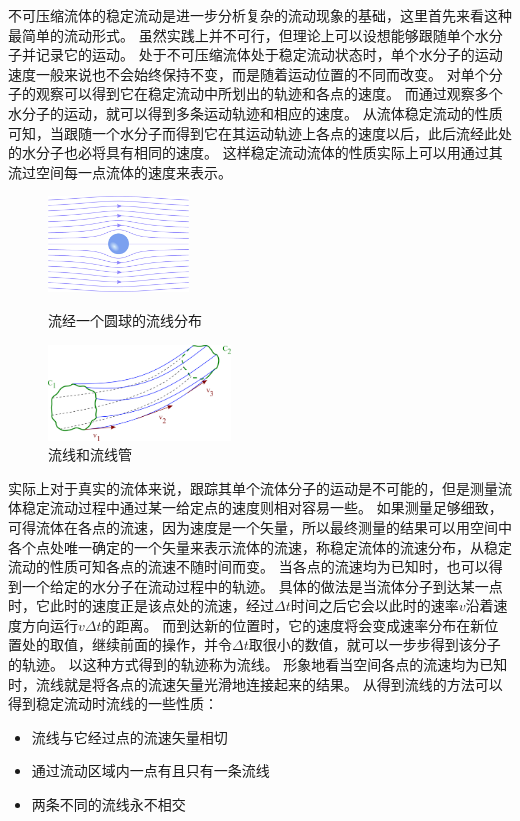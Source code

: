 不可压缩流体的稳定流动是进一步分析复杂的流动现象的基础，这里首先来看这种最简单的流动形式。
虽然实践上并不可行，但理论上可以设想能够跟随单个水分子并记录它的运动。
处于不可压缩流体处于稳定流动状态时，单个水分子的运动速度一般来说也不会始终保持不变，而是随着运动位置的不同而改变。
对单个分子的观察可以得到它在稳定流动中所划出的轨迹和各点的速度。
而通过观察多个水分子的运动，就可以得到多条运动轨迹和相应的速度。
从流体稳定流动的性质可知，当跟随一个水分子而得到它在其运动轨迹上各点的速度以后，此后流经此处的水分子也必将具有相同的速度。
这样稳定流动流体的性质实际上可以用通过其流过空间每一点流体的速度来表示。


\begin{figure}[hbtp]
\begin{minipage}[c]{0.45\textwidth}
\begin{center}
\includegraphics[height=1in]{images/Bubble_Buoyancy.pdf}
\end{center}
\caption{流经一个圆球的流线分布}
\label{fig: motion-流经一个圆球的流线分布}
\end{minipage}
\begin{minipage}[c]{0.45\textwidth}
\begin{center}
\includegraphics[height=1in]{images/motion-Streamlines_and_streamtube.pdf}
\end{center}
\caption{流线和流线管}
\label{fig: motion-流线和流线管}
\end{minipage}
\end{figure}


实际上对于真实的流体来说，跟踪其单个流体分子的运动是不可能的，但是测量流体稳定流动过程中通过某一给定点的速度则相对容易一些。
如果测量足够细致，可得流体在各点的流速，因为速度是一个矢量，所以最终测量的结果可以用空间中各个点处唯一确定的一个矢量来表示流体的流速，称稳定流体的流速分布，从稳定流动的性质可知各点的流速不随时间而变。
当各点的流速均为已知时，也可以得到一个给定的水分子在流动过程中的轨迹。
具体的做法是当流体分子到达某一点时，它此时的速度正是该点处的流速，经过$\Delta t$时间之后它会以此时的速率$v$沿着速度方向运行$v\Delta t$的距离。
而到达新的位置时，它的速度将会变成速率分布在新位置处的取值，继续前面的操作，并令$\Delta t$取很小的数值，就可以一步步得到该分子的轨迹。
以这种方式得到的轨迹称为{\heiti 流线}。
形象地看当空间各点的流速均为已知时，流线就是将各点的流速矢量光滑地连接起来的结果。
从得到流线的方法可以得到稳定流动时流线的一些性质：
\begin{itemize}
\item 流线与它经过点的流速矢量相切
\item 通过流动区域内一点有且只有一条流线
\item 两条不同的流线永不相交
\end{itemize}

